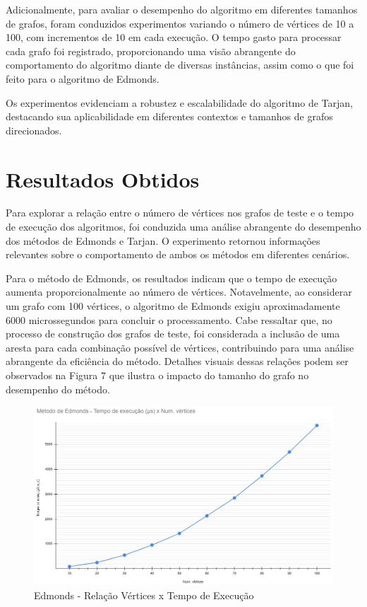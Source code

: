 \documentclass[12pt]{article}
\begin{document}
Adicionalmente, para avaliar o desempenho do algoritmo em diferentes tamanhos de grafos, foram conduzidos experimentos variando o número de vértices de 10 a 100, com incrementos de 10 em cada execução. O tempo gasto para processar cada grafo foi registrado, proporcionando uma visão abrangente do comportamento do algoritmo diante de diversas instâncias, assim como o que foi feito para o algoritmo de Edmonds.

Os experimentos evidenciam a robustez e escalabilidade do algoritmo de Tarjan, destacando sua aplicabilidade em diferentes contextos e tamanhos de grafos direcionados.

\section{Resultados Obtidos}

Para explorar a relação entre o número de vértices nos grafos de teste e o tempo de execução dos algoritmos, foi conduzida uma análise abrangente do desempenho dos métodos de Edmonds e Tarjan. O experimento retornou informações relevantes sobre o comportamento de ambos os métodos em diferentes cenários.

Para o método de Edmonds, os resultados indicam que o tempo de execução aumenta proporcionalmente ao número de vértices. Notavelmente, ao considerar um grafo com 100 vértices, o algoritmo de Edmonds exigiu aproximadamente 6000 microssegundos para concluir o processamento. Cabe ressaltar que, no processo de construção dos grafos de teste, foi considerada a inclusão de uma aresta para cada combinação possível de vértices, contribuindo para uma análise abrangente da eficiência do método. Detalhes visuais dessas relações podem ser observados na Figura 7 que ilustra o impacto do tamanho do grafo no desempenho do método.

\begin{figure}[ht]
\centering
\includegraphics[width=.7\textwidth]{AGM/grafico1.jpeg}
\caption{Edmonds - Relação Vértices x Tempo de Execução}
\end{figure}
\end{document}
